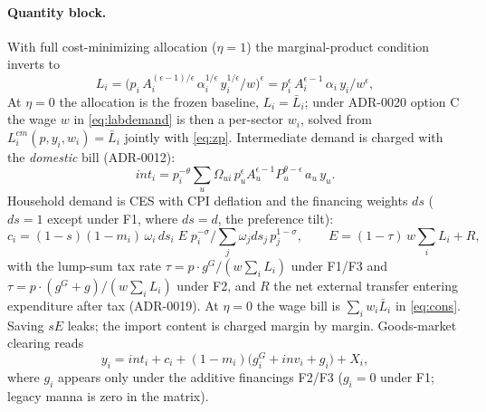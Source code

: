 \paragraph{Quantity block.} With full cost-minimizing allocation
($\eta = 1$) the marginal-product condition inverts to
\begin{equation}
L_i = \big( p_i\, A_i^{(\epsilon-1)/\epsilon}\, \alpha_i^{1/\epsilon}\,
      y_i^{1/\epsilon} / w \big)^{\epsilon}
    = p_i^{\epsilon}\, A_i^{\epsilon-1}\, \alpha_i\, y_i / w^{\epsilon},
\label{eq:labdemand}
\end{equation}
At $\eta = 0$ the allocation is the frozen baseline, $L_i = \bar{L}_i$;
under ADR-0020 option C the wage $w$ in
\eqref{eq:labdemand} is then a per-sector $w_i$, solved from
$L^{cm}_i(p, y_i, w_i) = \bar{L}_i$ jointly with \eqref{eq:zp}.
Intermediate demand is charged with the \emph{domestic}
bill (ADR-0012):
\begin{equation}
int_i = p_i^{-\theta} \sum_u \Omega_{ui}\,
        p_u^{\epsilon} A_u^{\epsilon-1} P_u^{\theta-\epsilon}\, a_u\, y_u.
\label{eq:int}
\end{equation}
Household demand is CES with CPI deflation and the financing weights
$ds$ ($ds = 1$ except under F1, where $ds = d$, the preference tilt):
\begin{equation}
c_i = (1-s)(1-m_i)\,\omega_i\, ds_i\; E\; p_i^{-\sigma} \Big/
      \textstyle\sum_j \omega_j ds_j\, p_j^{1-\sigma},
\qquad
E = (1-\tau)\, w \textstyle\sum_i L_i + R,
\label{eq:cons}
\end{equation}
with the lump-sum tax rate $\tau = p\!\cdot\! g^G / (w \sum_i L_i)$ under
F1/F3 and $\tau = p\!\cdot\!(g^G + g)/(w \sum_i L_i)$ under F2, and $R$ the
net external transfer entering expenditure after tax (ADR-0019).
At $\eta = 0$ the wage bill is
$\sum_i w_i \bar{L}_i$ in \eqref{eq:cons}. Saving
$sE$ leaks; the import content is charged margin by margin. Goods-market
clearing reads
\begin{equation}
y_i = int_i + c_i + (1-m_i)\big( g^G_i + inv_i + g_i \big) + X_i,
\label{eq:clearing}
\end{equation}
where $g_i$ appears only under the additive financings F2/F3
($g_i = 0$ under F1; legacy manna is zero in the matrix).


